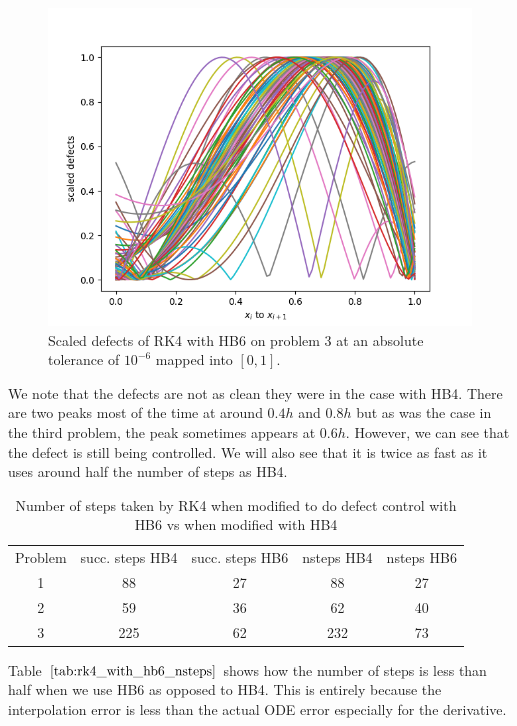 \documentclass{article}
\begin{document}
\begin{figure}[H]
\centering
\includegraphics[width=0.7\linewidth]{./figures/rk4_with_hb6_p3_scaled_defects}
\caption{Scaled defects of RK4 with HB6 on problem 3 at an absolute tolerance of $10^{-6}$ mapped into $[0, 1]$.}
\label{fig:rk4_with_hb6_p3_scaled_defects}
\end{figure}

We note that the defects are not as clean they were in the case with HB4. There are two peaks most of the time at around $0.4h$ and $0.8h$ but as was the case in the third problem, the peak sometimes appears at $0.6h$. However, we can see that the defect is still being controlled. We will also see that it is twice as fast as it uses around half the number of steps as HB4.

\begin{table}[h]
\caption {Number of steps taken by RK4 when modified to do defect control with HB6 vs when modified with HB4} \label{tab:rk4_with_hb6_nsteps}
\begin{center}
\begin{tabular}{ c c c c c } 
Problem & succ. steps HB4 & succ. steps HB6 & nsteps HB4  & nsteps HB6 \\ 
1       & 88                 &        27          & 88         & 27 \\ 
2       & 59                 &        36          & 62         & 40 \\
3       & 225                &        62          & 232        & 73 \\
\end{tabular}
\end{center}
\end{table}

Table $\ref{tab:rk4_with_hb6_nsteps}$ shows how the number of steps is less than half when we use HB6 as opposed to HB4. This is entirely because the interpolation error is less than the actual ODE error especially for the derivative.
\end{document}
